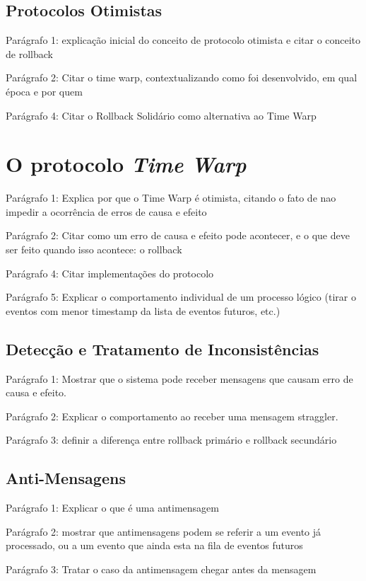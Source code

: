 \subsection{Protocolos Otimistas}

Parágrafo 1: explicação inicial do conceito de protocolo otimista e citar o conceito de rollback

Parágrafo 2: Citar o time warp, contextualizando como foi desenvolvido, em qual época e por quem

Parágrafo 4: Citar o Rollback Solidário como alternativa ao Time Warp

\section{O protocolo \textit{Time Warp}}

Parágrafo 1: Explica por que o Time Warp é otimista, citando o fato de nao impedir a ocorrência de erros de causa e efeito

Parágrafo 2: Citar como um erro de causa e efeito pode acontecer, e o que deve ser feito quando isso acontece: o rollback

Parágrafo 4: Citar implementações do protocolo

Parágrafo 5: Explicar o comportamento individual de um processo lógico (tirar o eventos com menor timestamp da lista de eventos futuros, etc.)

\subsection{Detecção e Tratamento de Inconsistências}

Parágrafo 1: Mostrar que o sistema pode receber mensagens que causam erro de causa e efeito.

Parágrafo 2: Explicar o comportamento ao receber uma mensagem straggler.

Parágrafo 3: definir a diferença entre rollback primário e rollback secundário

\subsection{Anti-Mensagens}

Parágrafo 1: Explicar o que é uma antimensagem

Parágrafo 2: mostrar que antimensagens podem se referir a um evento já processado, ou a um evento que ainda esta na fila de eventos futuros

Parágrafo 3: Tratar o caso da antimensagem chegar antes da mensagem

